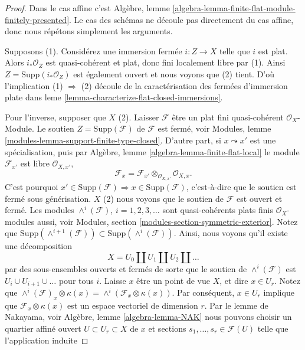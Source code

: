 \begin{proof}
Dans le cas affine c'est Algèbre, lemme \ref{algebra-lemma-finite-flat-module-finitely-presented}. Le cas des schémas ne découle pas directement du cas affine, donc nous répétons simplement les arguments.

\medskip\noindent
Supposons (1). Considérez une immersion fermée $i : Z \to X$ telle que $i$ est plat. Alors $i_*\mathcal{O}_Z$ est quasi-cohérent et plat, donc fini localement libre par (1). Ainsi $Z = \text{Supp}(i_*\mathcal{O}_Z)$ est également ouvert et nous voyons que (2) tient. D'où l'implication (1) $\Rightarrow$ (2) découle de la caractérisation des fermées d'immersion plate dans leme \ref{lemma-characterize-flat-closed-immersions}.

\medskip\noindent

Pour l'inverse, supposer que $X$ (2). Laisser $\mathcal{F}$ être un plat fini quasi-cohérent $\mathcal{O}_X$- Module. Le soutien $Z = \text{Supp}(\mathcal{F})$ de $\mathcal{F}$ est fermé, voir Modules, lemme \ref{modules-lemma-support-finite-type-closed}. D'autre part, si $x \leadsto x'$ est une spécialisation, puis par Algèbre, lemme \ref{algebra-lemma-finite-flat-local}
le module $\mathcal{F}_{x'}$ est libre $\mathcal{O}_{X, x'}$,
$$
\mathcal{F}_x =
\mathcal{F}_{x'} \otimes_{\mathcal{O}_{X, x'}} \mathcal{O}_{X, x}.
$$
C'est pourquoi
$x' \in \text{Supp}(\mathcal{F}) \Rightarrow x \in \text{Supp}(\mathcal{F})$, c'est-à-dire que le soutien est fermé sous générisation. $X$ (2) nous voyons que le soutien de $\mathcal{F}$
est ouvert et fermé. Les modules $\wedge^i(\mathcal{F})$, $i = 1, 2, 3, \ldots$
sont quasi-cohérents plats finis $\mathcal{O}_X$-modules aussi, voir Modules, section \ref{modules-section-symmetric-exterior}. Notez que
$\text{Supp}(\wedge^{i + 1}(\mathcal{F})) \subset
\text{Supp}(\wedge^i(\mathcal{F}))$. Ainsi, nous voyons qu'il existe une décomposition
$$
X = U_0 \amalg U_1 \amalg U_2 \amalg \ldots
$$
par des sous-ensembles ouverts et fermés de sorte que le soutien de
$\wedge^i(\mathcal{F})$ est $U_i \cup U_{i + 1} \cup \ldots$ pour tous $i$. Laisse $x$ être un point de vue $X$, et dire $x \in U_r$. Notez que
$\wedge^i(\mathcal{F})_x \otimes \kappa(x) =
\wedge^i(\mathcal{F}_x \otimes \kappa(x))$. Par conséquent, $x \in U_r$ implique que $\mathcal{F}_x \otimes \kappa(x)$
est un espace vectoriel de dimension $r$. Par le lemme de Nakayama, voir Algèbre, lemme \ref{algebra-lemma-NAK}
nous pouvons choisir un quartier affiné ouvert $U \subset U_r \subset X$
de $x$ et sections $s_1, \ldots, s_r \in \mathcal{F}(U)$ telle que l'application induite

\end{proof}
